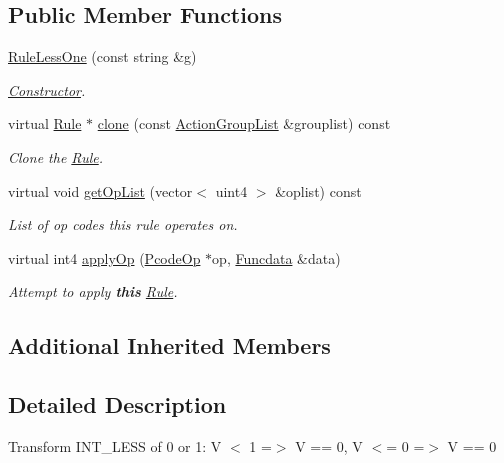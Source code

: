 \subsection*{Public Member Functions}
\begin{DoxyCompactItemize}
\item 
\mbox{\hyperlink{class_rule_less_one_a5205237e5159d2accce095129aef61df}{Rule\+Less\+One}} (const string \&g)
\begin{DoxyCompactList}\small\item\em \mbox{\hyperlink{class_constructor}{Constructor}}. \end{DoxyCompactList}\item 
virtual \mbox{\hyperlink{class_rule}{Rule}} $\ast$ \mbox{\hyperlink{class_rule_less_one_aa048e872f55a1c8034660279f58f8e5b}{clone}} (const \mbox{\hyperlink{class_action_group_list}{Action\+Group\+List}} \&grouplist) const
\begin{DoxyCompactList}\small\item\em Clone the \mbox{\hyperlink{class_rule}{Rule}}. \end{DoxyCompactList}\item 
virtual void \mbox{\hyperlink{class_rule_less_one_a5750d5201b5022d8cb8caf71a4fa85d3}{get\+Op\+List}} (vector$<$ uint4 $>$ \&oplist) const
\begin{DoxyCompactList}\small\item\em List of op codes this rule operates on. \end{DoxyCompactList}\item 
virtual int4 \mbox{\hyperlink{class_rule_less_one_ac787cb9aa39e6d205659bdf236920619}{apply\+Op}} (\mbox{\hyperlink{class_pcode_op}{Pcode\+Op}} $\ast$op, \mbox{\hyperlink{class_funcdata}{Funcdata}} \&data)
\begin{DoxyCompactList}\small\item\em Attempt to apply {\bfseries{this}} \mbox{\hyperlink{class_rule}{Rule}}. \end{DoxyCompactList}\end{DoxyCompactItemize}
\subsection*{Additional Inherited Members}


\subsection{Detailed Description}
Transform I\+N\+T\+\_\+\+L\+E\+SS of 0 or 1\+: {\ttfamily V $<$ 1 =$>$ V == 0, V $<$= 0 =$>$ V == 0} 

